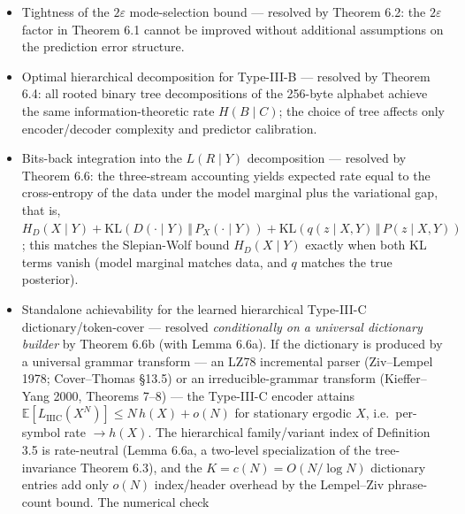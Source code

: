 \documentclass[
]{article}
\begin{document}
\begin{itemize}
  from CLIQUE at $N = 3s + 1$ (where the algebraic identity
  $A_s(1) = A_s(2)$ collapses the cost to a function of $n_0(S)$
  alone). Together this characterizes the exact complexity
  threshold of the support-selection problem. The complementary
  approximation question --- whether a polynomial-time
  $\alpha$-approximation exists for $\alpha < O(N^{1/4 +
  \varepsilon})$ on general dependent joint laws --- is tied to
  the long-standing open approximability of densest-$k$-subgraph
  and is listed in §13.2.
\item
  Tightness of the $2\varepsilon$ mode-selection bound --- resolved
  by Theorem 6.2: the $2\varepsilon$ factor in Theorem 6.1 cannot be
  improved without additional assumptions on the prediction error
  structure.
\item
  Optimal hierarchical decomposition for Type-III-B --- resolved by
  Theorem 6.4: all rooted binary tree decompositions of the 256-byte
  alphabet achieve the same information-theoretic rate
  $H(B \mid C)$; the choice of tree affects only encoder/decoder
  complexity and predictor calibration.
\item
  Bits-back integration into the $L(R \mid Y)$ decomposition ---
  resolved by Theorem 6.6: the three-stream accounting yields
  expected rate equal to the cross-entropy of the data under the
  model marginal plus the variational gap, that is,
  $H_D(X \mid Y) + \mathrm{KL}(D(\cdot \mid Y)\,\Vert\,
  P_X(\cdot \mid Y)) + \mathrm{KL}(q(z \mid X, Y)\,\Vert\,
  P(z \mid X, Y))$; this matches the Slepian-Wolf bound
  $H_D(X \mid Y)$ exactly when both KL terms vanish (model marginal
  matches data, and $q$ matches the true posterior).
\item
  Standalone achievability for the learned hierarchical Type-III-C
  dictionary/token-cover --- resolved \emph{conditionally on a universal
  dictionary builder} by Theorem 6.6b (with Lemma 6.6a). If the
  dictionary is produced by a universal grammar transform --- an LZ78
  incremental parser (Ziv--Lempel 1978; Cover--Thomas \S13.5) or an
  irreducible-grammar transform (Kieffer--Yang 2000, Theorems 7--8) ---
  the Type-III-C encoder attains $\mathbb{E}[L_{\mathrm{IIIC}}(X^N)] \le
  N\,h(X) + o(N)$ for stationary ergodic $X$, i.e.\ per-symbol rate $\to
  h(X)$. The hierarchical family/variant index of Definition 3.5 is
  rate-neutral (Lemma 6.6a, a two-level specialization of the
  tree-invariance Theorem 6.3), and the $K = c(N) = O(N/\log N)$
  dictionary entries add only $o(N)$ index/header overhead by the
  Lempel--Ziv phrase-count bound. The numerical check

\end{itemize}
\end{document}
